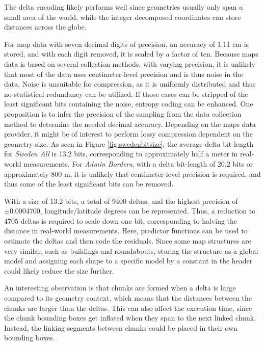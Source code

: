 The delta encoding likely performs well since geometries usually only span a small area of the world, while the integer decomposed coordinates can store distances across the globe.

For map data with seven decimal digits of precision, an accuracy of 1.11 cm is stored, and with each digit removed, it is scaled by a factor of ten. Because maps data is based on several collection methods, with varying precision, it is unlikely that most of the data uses centimeter-level precision and is thus noise in the data. Noise is unsuitable for compression, as it is uniformly distributed and thus no statistical redundancy can be utilized. If those cases can be stripped of the least significant bits containing the noise, entropy coding can be enhanced. One proposition is to infer the precision of the sampling from the data collection method to determine the needed decimal accuracy. Depending on the maps data provider, it might be of interest to perform lossy compression dependent on the geometry size. As seen in Figure \ref{fig:swedenbitsize}, the average delta bit-length for \emph{Sweden All} is 13.2 bits, corresponding to approximately half a meter in real-world measurements. For \emph{Admin Borders}, with a delta bit-length of 20.2 bits or approximately 800 m,  it is unlikely that centimeter-level precision is required, and thus some of the least significant bits can be removed.

With a size of 13.2 bits, a total of 9400 deltas, and the highest precision of $\pm 0.0004700$, longitude/latitude degrees can be represented. Thus, a reduction to 4705 deltas is required to scale down one bit, corresponding to halving the distance in real-world measurements. Here, predictor functions can be used to estimate the deltas and then code the residuals. Since some map structures are very similar, such as buildings and roundabouts, storing the structure as a global model and assigning each shape to a specific model by a constant in the header could likely reduce the size further. 

An interesting observation is that chunks are formed when a delta is large compared to its geometry context, which means that the distances between the chunks are larger than the deltas. This can also affect the execution time, since the chunk bounding boxes get inflated when they span to the next linked chunk. Instead, the linking segments between chunks could be placed in their own bounding boxes.


